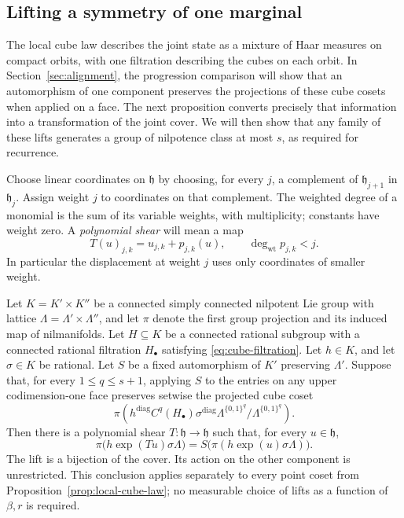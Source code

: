 \subsection{Lifting a symmetry of one marginal}

The local cube law describes the joint state as a mixture of Haar
measures on compact orbits, with one filtration describing the cubes
on each orbit.  In Section~\ref{sec:alignment}, the progression
comparison will show that an automorphism of one component preserves
the projections of these cube cosets when applied on a face.  The
next proposition converts precisely that information into a
transformation of the joint cover.  We will then show that any family
of these lifts generates a group of nilpotence class at most $s$, as
required for recurrence.

Choose linear coordinates on $\mathfrak h$ by choosing, for every $j$,
a complement of $\mathfrak h_{j+1}$ in $\mathfrak h_j$.
Assign weight $j$ to coordinates on that complement.  The weighted degree
of a monomial is the sum of its variable weights, with multiplicity;
constants have weight zero.  A \emph{polynomial shear} will mean a map
\begin{equation}
 T(u)_{j,k}=u_{j,k}+p_{j,k}(u),\qquad
 \deg_{\mathrm{wt}}p_{j,k}<j.
 \label{eq:weighted-shear}
\end{equation}
In particular the displacement at weight $j$ uses only coordinates of
smaller weight.

\begin{proposition}
\label{prop:face-lift}
Let $K=K'\times K''$ be a connected simply connected nilpotent Lie
group with lattice $\Lambda=\Lambda'\times\Lambda''$, and let $\pi$
denote the first group projection and its induced map of nilmanifolds.
Let $H\subseteq K$ be a connected rational subgroup with a connected
rational filtration $H_\bullet$ satisfying \eqref{eq:cube-filtration}.
Let $h\in K$, and
let $\sigma\in K$ be rational.  Let $S$ be a fixed automorphism of $K'$
preserving $\Lambda'$.  Suppose that, for every $1\leq q\leq s+1$,
applying $S$ to the entries on any upper codimension-one face preserves
setwise
the projected cube coset
\begin{equation}
 \pi\left(h^{\mathrm{diag}}C^q(H_\bullet)
                \sigma^{\mathrm{diag}}\Lambda^{\{0,1\}^q}/
                   \Lambda^{\{0,1\}^q}\right).
 \label{eq:projected-face-coset}
\end{equation}
Then there is a polynomial shear $T:\mathfrak h\to\mathfrak h$ such
that, for every $u\in\mathfrak h$,
\begin{equation}
 \pi\bigl(h\exp(Tu)\sigma\Lambda\bigr)
 =S\bigl(\pi(h\exp(u)\sigma\Lambda)\bigr).
 \label{eq:joint-lift-identity}
\end{equation}
The lift is a bijection of the cover.  Its action on the other component
is unrestricted.  This conclusion applies separately to every point
coset from Proposition~\ref{prop:local-cube-law}; no measurable choice
of lifts as a function of $\beta,r$ is required.
\end{proposition}

